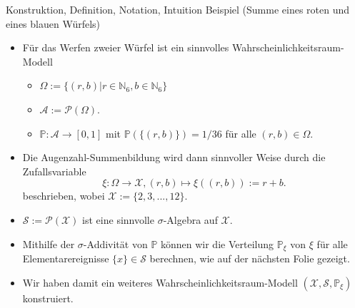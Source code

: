 \documentclass[
  8pt,
  ignorenonframetext,
]{beamer}
\begin{document}
\begin{frame}{Konstruktion, Definition, Notation, Intuition}
\protect\hypertarget{konstruktion-definition-notation-intuition-3}{}
Beispiel (Summe eines roten und eines blauen Würfels) \vspace{1mm}

\small
\begin{itemize}
\justifying
\item Für das Werfen zweier Würfel ist ein sinnvolles Wahrscheinlichkeitsraum-Modell
\begin{itemize}
\small
\item $\Omega := \{(r,b)| r  \in \mathbb{N}_6, b \in \mathbb{N}_6\}$
\item $\mathcal{A} := \mathcal{P}(\Omega)$.
\item $\mathbb{P} : \mathcal{A} \to [0,1]$ mit $\mathbb{P}(\{(r,b)\}) = 1/36$ für alle $(r,b) \in \Omega$.

\end{itemize}

\item Die Augenzahl-Summenbildung wird dann sinnvoller Weise durch die Zufallsvariable
\begin{equation}
\xi : \Omega \to \mathcal{X}, (r,b) \mapsto \xi((r,b)) := r + b.
\end{equation}
beschrieben, wobei $\mathcal{X} := \{2,3,...,12\}$.

\item $\mathcal{S} := \mathcal{P}(\mathcal{X})$ ist eine sinnvolle $\sigma$-Algebra auf $\mathcal{X}$.

\item Mithilfe der $\sigma$-Addivität von $\mathbb{P}$ können wir die Verteilung
$\mathbb{P}_\xi$ von $\xi$ für alle Elementarereignisse $\{x\} \in \mathcal{S}$ berechnen,
wie auf der nächsten Folie gezeigt.
\item Wir haben damit ein weiteres Wahrscheinlichkeitsraum-Modell
$(\mathcal{X}, \mathcal{S}, \mathbb{P}_\xi)$ konstruiert.
\end{itemize}
\end{frame}
\end{document}
